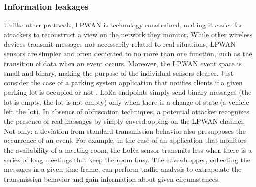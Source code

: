 \subsubsection{Information leakages}
Unlike other protocols, LPWAN is technology-constrained, making it easier for attackers to reconstruct a view on the network they monitor. While other wireless devices transmit messages not necessarily related to real situations, LPWAN sensors are simpler and often dedicated to no more than one function, such as the transition of data when an event occurs. Moreover, the LPWAN event space is small and binary, making the purpose of the individual sensors clearer. Just consider the case of a parking system application that notifies clients if a given parking lot is occupied or not \cite{app10134674}. LoRa endpoints simply send binary messages (the lot is empty, the lot is not empty) only when there is a change of state (a vehicle left the lot). In absence of obfuscation techniques, a potential attacker recognizes the presence of real messages by simply eavesdropping on the LPWAN channel. Not only: a deviation from standard transmission behavior also presupposes the occurrence of an event. For example, in the case of an application that monitors the availability of a meeting room, the LoRa sensor transmits less when there is a series of long meetings that keep the room busy. The eavesdropper, collecting the messages in a given time frame, can perform traffic analysis to extrapolate the transmission behavior and gain information about given circumstances. 

